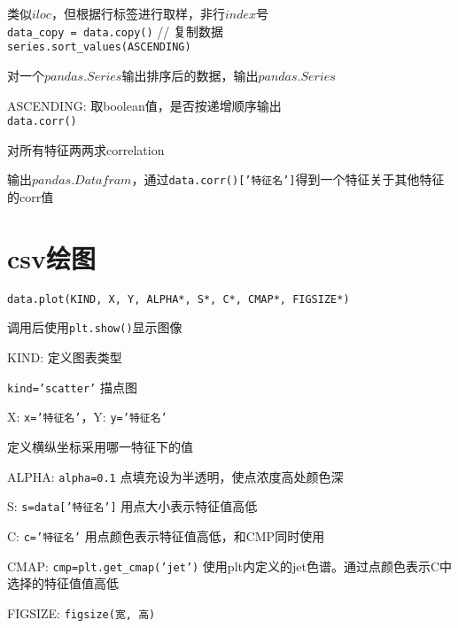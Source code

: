 \documentclass[UTF8]{ctexart}
\begin{document}
  类似$iloc$，但根据行标签进行取样，非行$index$号\\
\texttt{data\_copy = data.copy()} // 复制数据\\
\texttt{series.sort\_values(ASCENDING)}

  对一个$pandas.Series$输出排序后的数据，输出$pandas.Series$

  ASCENDING: 取boolean值，是否按递增顺序输出\\
\texttt{data.corr()} 
  
  对所有特征两两求correlation

  输出$pandas.Datafram$，通过\texttt{data.corr()['特征名']}得到一个特征关于其他特征的corr值

\section{csv绘图}
\noindent \texttt{data.plot(KIND, X, Y, ALPHA*, S*, C*, CMAP*, FIGSIZE*)}

  调用后使用\texttt{plt.show()}显示图像

  KIND: 定义图表类型
  
  \quad \texttt{kind='scatter'} 描点图

  X: \texttt{x='特征名'}，Y: \texttt{y='特征名'}

  \quad 定义横纵坐标采用哪一特征下的值

  ALPHA: \texttt{alpha=0.1} 点填充设为半透明，使点浓度高处颜色深

  S: \texttt{s=data['特征名']} 用点大小表示特征值高低
  
  C: \texttt{c='特征名'} 用点颜色表示特征值高低，和CMP同时使用

  CMAP: \texttt{cmp=plt.get\_cmap('jet')} 使用plt内定义的jet色谱。通过点颜色表示C中选择的特征值值高低

  FIGSIZE: \texttt{figsize(宽, 高)}
  
  
\end{document}

